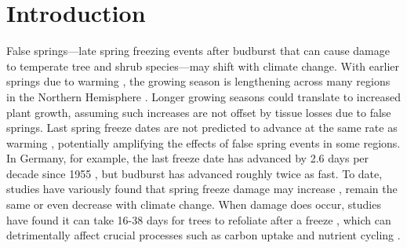 \documentclass{article}\usepackage[]{graphicx}\usepackage[]{color}
\begin{document}
\section*{Introduction} %
False springs---late spring freezing events after budburst that can cause damage to temperate tree and shrub species---may shift with climate change. With earlier springs due to warming \citep{Wolkovich2012,IPCC2014}, the growing season is lengthening across many regions in the Northern Hemisphere \citep{Chen2005,Liu2006, Kukal2018}. Longer growing seasons could translate to increased plant growth, assuming such increases are not offset by tissue losses due to false springs. Last spring freeze dates are not predicted to advance at the same rate as warming \citep{Inouye2008,Martin2010,Labe2016,Wypych2016a,Sgubin2018}, potentially amplifying the effects of false spring events in some regions. In Germany, for example, the last freeze date has advanced by 2.6 days per decade since 1955 \citep{Zohner2016}, but budburst has advanced roughly twice as fast. To date, studies have variously found that spring freeze damage may increase \citep{Hannenin1991,Augspurger2013,Labe2016}, remain the same \citep{Scheifinger2003} or even decrease \citep{Kramer1994, Vitra2017} with climate change. When damage does occur, studies have found it can take 16-38 days for trees to refoliate after a freeze \citep{Gu2008,Augspurger2009, Augspurger2013, Menzel2015}, which can detrimentally affect crucial processes such as carbon uptake and nutrient cycling \citep{Hufkens2012,Richardson2013,Klosterman2018}.  
\end{document}

